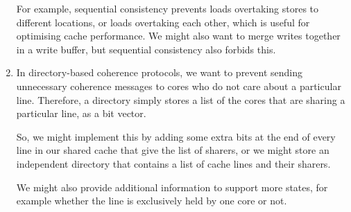 \begin{enumerate}[label=(\alph*)]
    For example, sequential consistency prevents loads overtaking stores to different locations, or loads overtaking each other, which is useful for optimising cache performance. We might also want to merge writes together in a write buffer, but sequential consistency also forbids this.

  \item
    In directory-based coherence protocols, we want to prevent sending unnecessary coherence messages to cores who do not care about a particular line. Therefore, a directory simply stores a list of the cores that are sharing a particular line, as a bit vector.

    So, we might implement this by adding some extra bits at the end of every line in our shared cache that give the list of sharers, or we might store an independent directory that contains a list of cache lines and their sharers.

    We might also provide additional information to support more states, for example whether the line is exclusively held by one core or not.
        
\end{enumerate}

